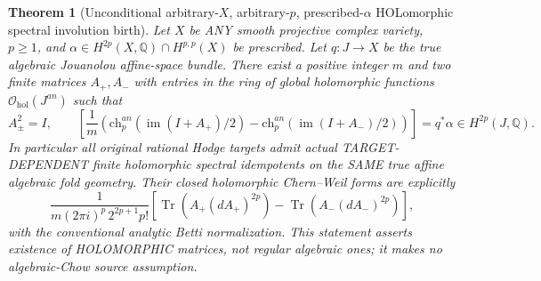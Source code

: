 \documentclass[11pt]{article}
\newtheorem{theorem}{Theorem}[section]
\begin{document}
\begin{theorem}[Unconditional arbitrary-$X$, arbitrary-$p$, prescribed-$\alpha$ HOLomorphic spectral involution birth]
Let $X$ be ANY smooth projective complex variety,
$p\ge1$, and
$\alpha\in H^{2p}(X,\mathbb Q)\cap H^{p,p}(X)$
be prescribed. Let $q:J\to X$ be the true
algebraic Jouanolou affine-space bundle.
There exist a positive integer $m$ and
two finite matrices $A_+,A_-$ with entries in
the ring of global \emph{holomorphic} functions
$\mathcal O_{\mathrm{hol}}(J^{an})$ such that
\[
 \boxed{A_\pm^2=I,\qquad
  \left[\frac{1}{m}\left(
    \mathrm{ch}^{an}_p(\operatorname{im}(I+A_+)/2)
   -\mathrm{ch}^{an}_p(\operatorname{im}(I+A_-)/2)
  \right)\right]=q^*\alpha\in H^{2p}(J,\mathbb Q).}       \tag{32}
\]
In particular all original rational Hodge targets admit actual
TARGET-DEPENDENT \emph{finite holomorphic spectral idempotents}
on the SAME true affine algebraic fold geometry.
Their closed holomorphic Chern--Weil forms are explicitly
\[
 \boxed{\displaystyle
 \frac{1}{m(2\pi i)^p\,2^{2p+1}p!}
 \left[
   \operatorname{Tr}(A_+(dA_+)^{2p})
  -\operatorname{Tr}(A_-(dA_-)^{2p})
 \right],}                                               \tag{33}
\]
with the conventional analytic Betti normalization.
This statement asserts existence of HOLOMORPHIC matrices,
not regular algebraic ones; it makes no algebraic-Chow
source assumption.
\end{theorem}
\end{document}
